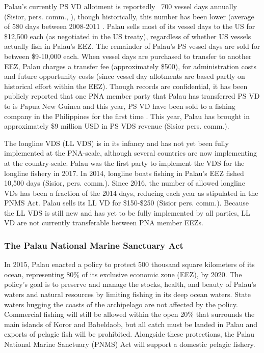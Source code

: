 \documentclass[9pttwoside,lineno]{pnas-new}
\begin{document}
Palau’s currently PS VD allotment is reportedly ~700 vessel days annually (Sisior, pers. comm., \cite{Pojas2018}), though historically, this number has been lower (average of 580 days between 2008-2011 \citep{Tewid2013}. Palau sells most of its vessel days to the US for \$12,500 each (as negotiated in the US treaty), regardless of whether US vessels actually fish in Palau’s EEZ. The remainder of Palau’s PS vessel days are sold for between \$9-10,000 each. When vessel days are purchased to transfer to another EEZ, Palau charges a transfer fee (approximately \$500), for administration costs and future opportunity costs (since vessel day allotments are based partly on historical effort within the EEZ). Though records are confidential, it has been publicly reported that one PNA member party that Palau has transferred PS VD to is Papua New Guinea \citep{Tewid2013} and this year, PS VD have been sold to a fishing company in the Philippines for the first time \citep{Pojas2018}. This year, Palau has brought in approximately \$9 million USD in PS VDS revenue (Sisior pers. comm.). 

The longline VDS (LL VDS) is in its infancy and has not yet been fully implemented at the PNA-scale, although several countries are now implementing at the country-scale. Palau was the first party to implement the VDS for the longline fishery in 2017. In 2014, longline boats fishing in Palau’s EEZ fished 10,500 days (Sisior, pers. comm.). Since 2016, the number of allowed longline VDs has been a fraction of the 2014 days, reducing each year as stipulated in the PNMS Act. Palau sells its LL VD for \$150-\$250 (Sisior pers. comm.). Because the LL VDS is still new and has yet to be fully implemented by all parties, LL VD are not currently transferable between PNA member EEZs. 


\subsubsection{The Palau National Marine Sanctuary Act}

In 2015, Palau enacted a policy to protect 500 thousand square kilometers of its ocean, representing 80\% of its exclusive economic zone (EEZ), by 2020. The policy’s goal is to preserve and manage the stocks, health, and beauty of Palau’s waters and natural resources by limiting fishing in its deep ocean waters. State waters hugging the coasts of the archipelago are not affected by the policy. Commercial fishing will still be allowed within the open 20\% that surrounds the main islands of Koror and Babeldaob, but all catch must be landed in Palau and exports of pelagic fish will be prohibited. Alongside these protections, the Palau National Marine Sanctuary (PNMS) Act will support a domestic pelagic fishery.
\end{document}
